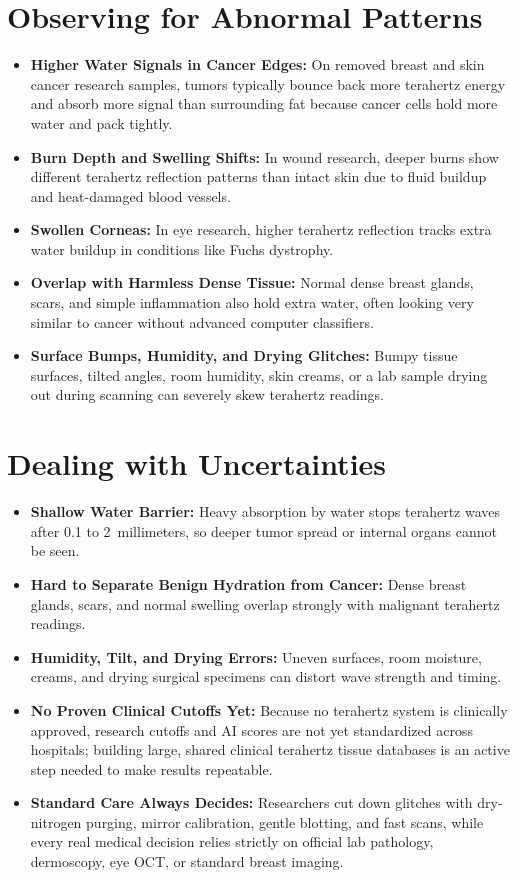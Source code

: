 \section{Observing for Abnormal Patterns}
\begin{itemize}
  \item \textbf{Higher Water Signals in Cancer Edges:} On removed breast and skin cancer research samples, tumors typically bounce back more terahertz energy and absorb more signal than surrounding fat because cancer cells hold more water and pack tightly.
  \item \textbf{Burn Depth and Swelling Shifts:} In wound research, deeper burns show different terahertz reflection patterns than intact skin due to fluid buildup and heat-damaged blood vessels.
  \item \textbf{Swollen Corneas:} In eye research, higher terahertz reflection tracks extra water buildup in conditions like Fuchs dystrophy.
  \item \textbf{Overlap with Harmless Dense Tissue:} Normal dense breast glands, scars, and simple inflammation also hold extra water, often looking very similar to cancer without advanced computer classifiers.
  \item \textbf{Surface Bumps, Humidity, and Drying Glitches:} Bumpy tissue surfaces, tilted angles, room humidity, skin creams, or a lab sample drying out during scanning can severely skew terahertz readings.
\end{itemize}

\section{Dealing with Uncertainties}
\begin{itemize}
  \item \textbf{Shallow Water Barrier:} Heavy absorption by water stops terahertz waves after 0.1 to 2~millimeters, so deeper tumor spread or internal organs cannot be seen.
  \item \textbf{Hard to Separate Benign Hydration from Cancer:} Dense breast glands, scars, and normal swelling overlap strongly with malignant terahertz readings.
  \item \textbf{Humidity, Tilt, and Drying Errors:} Uneven surfaces, room moisture, creams, and drying surgical specimens can distort wave strength and timing.
  \item \textbf{No Proven Clinical Cutoffs Yet:} Because no terahertz system is clinically approved, research cutoffs and AI scores are not yet standardized across hospitals; building large, shared clinical terahertz tissue databases is an active step needed to make results repeatable.
  \item \textbf{Standard Care Always Decides:} Researchers cut down glitches with dry-nitrogen purging, mirror calibration, gentle blotting, and fast scans, while every real medical decision relies strictly on official lab pathology, dermoscopy, eye OCT, or standard breast imaging.
\end{itemize}

